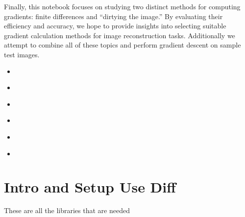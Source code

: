 \documentclass[letterpaper,10pt,english]{jupyterBook}
\begin{document}
\sphinxAtStartPar
Finally, this notebook focuses on studying two distinct methods for computing gradients: finite differences and “dirtying the image.” By evaluating their efficiency and accuracy, we hope to provide insights into selecting suitable gradient calculation methods for image reconstruction tasks. Additionally we attempt to combine all of these topics and perform gradient descent on sample test images.
\begin{itemize}
\item {} 
\sphinxAtStartPar
{\hyperref[\detokenize{data::doc}]{}}

\item {} 
\sphinxAtStartPar
{\hyperref[\detokenize{interpolation::doc}]{}}

\item {} 
\sphinxAtStartPar
{\hyperref[\detokenize{loss::doc}]{}}

\item {} 
\sphinxAtStartPar
{\hyperref[\detokenize{finite_gradient::doc}]{}}

\item {} 
\sphinxAtStartPar
{\hyperref[\detokenize{dirty_gradient::doc}]{}}

\item {} 
\sphinxAtStartPar
{\hyperref[\detokenize{utility::doc}]{}}

\end{itemize}

\sphinxstepscope


\chapter{Intro and Setup Use Diff}
\label{\detokenize{data:intro-and-setup-use-diff}}\label{\detokenize{data::doc}}
\sphinxAtStartPar
These are all the libraries that are needed
\end{document}
